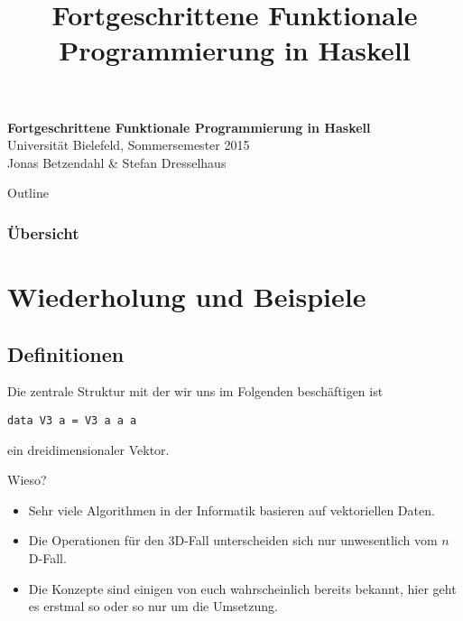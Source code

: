 \documentclass{beamer}
\title{Fortgeschrittene Funktionale Programmierung in Haskell}
\begin{document}
  

  \begin{frame}
  \begin{center}
    \huge\textbf{Fortgeschrittene Funktionale Programmierung in Haskell}\\ \bigskip
    \LARGE Universität Bielefeld, Sommersemester 2015\\ \bigskip
    \large Jonas Betzendahl \& Stefan Dresselhaus
    \end{center}
  \end{frame}

\begin{frame}[allowframebreaks]{Outline}
\frametitle{Übersicht}
\tableofcontents[hideallsubsections]
\end{frame}

\section{Wiederholung und Beispiele}

\subsection{Definitionen}

\begin{frame}[fragile]
Die zentrale Struktur mit der wir uns im Folgenden beschäftigen ist\smallskip

\pause
\begin{verbatim}
data V3 a = V3 a a a
\end{verbatim}
\smallskip

ein dreidimensionaler Vektor.\smallskip

\pause
Wieso?
\pause
\smallskip

\begin{itemize}
 \item Sehr viele Algorithmen in der Informatik basieren auf vektoriellen Daten.
 \pause
 \item Die Operationen für den 3D-Fall unterscheiden sich nur unwesentlich vom $n$D-Fall.
 \pause
 \item Die Konzepte sind einigen von euch wahrscheinlich bereits bekannt, hier geht es erstmal so oder so nur um die Umsetzung.
\end{itemize}
\end{frame}
\end{document}
